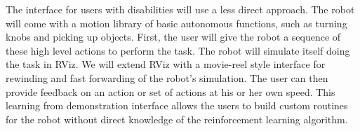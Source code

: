 \documentclass{sig-alternate-2013}
\begin{document}
The interface for users with disabilities will use a less direct approach. The robot will come with a motion library of basic autonomous functions, such as turning knobs and picking up objects. First, the user will give the robot a sequence of these high level actions to perform the task. The robot will simulate itself doing the task in RViz. We will extend RViz with a movie-reel style interface for rewinding and fast forwarding of the robot's simulation. The user can then provide feedback on an action or set of actions at his or her own speed. This learning from demonstration interface allows the users to build custom routines for the robot without direct knowledge of the reinforcement learning algorithm.


\end{document}
